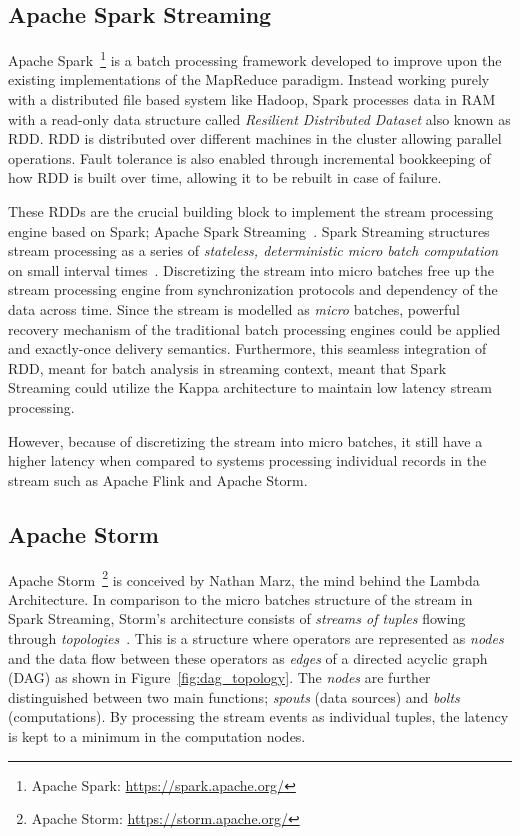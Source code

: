 \subsection{Apache Spark Streaming}%
\label{sub:Apache Spark}
Apache Spark~\footnote{Apache Spark: \url{https://spark.apache.org/}} is a batch 
processing framework developed to improve upon the existing implementations of the 
MapReduce paradigm. Instead working purely with a distributed file based system like 
Hadoop, Spark processes data in RAM with a read-only data structure called 
\emph{Resilient Distributed Dataset} also known as RDD. RDD is distributed over 
different machines in the cluster allowing parallel operations. Fault tolerance 
is also enabled through incremental bookkeeping of how RDD is built over time, allowing 
it to be rebuilt in case of failure.

These RDDs are the crucial building block to implement the stream processing engine 
based on Spark; Apache Spark Streaming~\cite{spark_streaming}. Spark Streaming structures
stream processing as a series of \emph{stateless, deterministic micro batch
computation} on small interval times~\cite{spark_streaming}. Discretizing the stream 
into micro batches free up the stream processing engine from synchronization protocols 
and dependency of the data across time. Since the stream is modelled as \emph{micro} 
batches, powerful recovery mechanism of the traditional batch processing engines could
be applied and exactly-once delivery semantics. 
Furthermore, this seamless integration of RDD, meant for batch analysis in 
streaming context, meant that Spark Streaming could utilize the Kappa architecture 
to maintain low latency stream processing. 

However, because of discretizing the stream into micro batches, it still have a 
higher latency when compared to systems processing individual records in the stream
such as Apache Flink and Apache Storm. 


\subsection{Apache Storm}%
\label{sub:Apache Storm}

Apache Storm~\footnote{Apache Storm: \url{https://storm.apache.org/}} is 
conceived by Nathan Marz, the mind behind the Lambda Architecture. In comparison to 
the micro batches structure of the stream in Spark Streaming, Storm's architecture 
consists of \emph{streams of tuples} flowing through
\emph{topologies}~\cite{storm_twitter}. This is a structure where operators are 
represented as \emph{nodes} and the data flow between these operators as \emph{edges} of 
a directed acyclic graph (DAG) as shown in Figure~\ref{fig:dag_topology}. The \emph{nodes} are further distinguished between 
two main functions; \emph{spouts} (data sources) and \emph{bolts} (computations).  
By processing the stream events as individual tuples, the latency is kept 
to a minimum in the computation nodes. 

